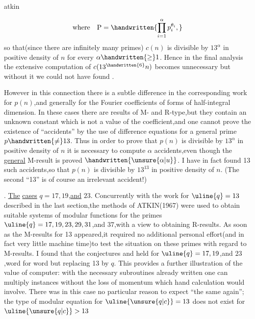 \noindent\hfill atkin 

\[
\text{where}\quad\mathrm{P}=\handwritten{\prod_{i=1}^{\alpha}p_i^{\theta_i},}
\]
\noindent so that(since there are infinitely many primes) \uline{$c(n)$} is divisible by $13^{\alpha}$ in positive density of $n$ for every $\alpha\handwritten{\geq}1$. Hence in the final analysis the extensive computation of $c(13^{\handwritten{6}}n)$ becomes unnecessary  but without it we could not have found .

However in this connection there is a subtle difference in the corresponding work for \uline{$p(n)$},and generally for the Fourier coefficients of forms of half-integral dimension. In these cases there are results of M- and R-type,but they contain an unknown constant which is not a value of the coefficient,and one cannot prove the existence of ``accidents'' by the use of difference equations for a general prime $p\handwritten{\ne}13$. Thus in order to prove that \uline{$p(n)$} is divisible by $13^{\alpha}$ in positive density of \uline{$n$} it is necessary to compute $\alpha$ accidents,even though the \uline{general} M-result is proved  $\handwritten{\unsure{\alpha|u}}$. I have in fact found 13 such accidents,so that \uline{$p(n)$} is divisible by $13^{13}$ in positive density of $n$. (The second ``13'' is of course an irrelevant accident!)

\noindent {}. \uline{The} \uline{cases} $q=17,19$,\uline{and} $23$. Concurrently with the work for $\uline{q}=13$ described in the last section,the methods of ATKIN(1967) were used to obtain suitable systems of modular functions for the primes $\uline{q}=17,19,23,29,31$,and $37$,with a view to obtaining  R-results. As soon as the M-results for 13 appeared,it required no additional personal effort(and in fact very little machine time)to test the situation on these primes with regard to M-results. I found that the conjectures  and  held for $\uline{q}=17,19$,and $23$,word for word but replacing 13 by \uline{$q$}. This provides a further illustration of the value of  computer: with the necessary subroutines already written one can multiply instances without the loss of momentum which hand calculation would involve. There was in this case no particular reason to expect ``the same again''; the type of modular equation for $\uline{\unsure{q|c}}=13$ does not exist for $\uline{\unsure{q|c}}>13$

